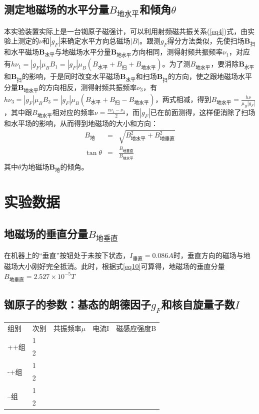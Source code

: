 \documentclass[a4paper]{article}
\begin{document}
\subsection{测定地磁场的水平分量$B_{\text{地水平}}$和倾角$\theta$}
本实验装置实际上是一台铷原子磁强计，可以利用射频磁共振关系(\ref{eq4})式，由实验上测定的$\nu$和$|g_F|$来确定水平方向总磁场$|B|$。跟测$g_F$得分方法类似，先使扫场$\bm{B}_{\text{扫}}$和水平磁场$\bm{B}_{\text{水平}}$与地磁场水平分量$\bm{B}_{\text{地水平}}$方向相同，测得射频共振频率$\nu_1$，对应有$h\nu_1 = |g_F|\mu_BB_1 = |g_F|\mu_B(B_{\text{水平}} + B_{\text{扫}} + B_{\text{地水平}})$。为了测$B_{\text{地水平}}$，要消除$\bm{B}_{\text{水平}}$和$\bm{B}_{\text{扫}}$的影响，于是同时改变水平磁场$\bm{B}_{\text{水平}}$和扫场$\bm{B}_{\text{扫}}$的方向，使之跟地磁场水平分量$\bm{B}_{\text{地水平}}$的方向相反，测得射频共振频率$\nu_3$，有$h\nu_3 = |g_F|\mu_BB_3 = |g_F|\mu_B(B_{\text{水平}} + B_{\text{扫}} - B_{\text{地水平}})$，两式相减，得到$B_{\text{地水平}} = \frac{h\nu}{\mu_B|g_F|}$，其中跟$B_{\text{地水平}}$相对应的频率$\nu = \frac{v\nu_1 - \nu_3}{2}$，而$|g_F|$已在前面测得，这样便消除了扫场和水平场的影响，从而得到地磁场的大小和方向：
\begin{eqnarray}
B_{\text{地}} &=& \sqrt{B^2_{\text{地水平}} + B^2_{\text{地垂直}}}\label{eq7}\\
\tan\theta &=& \frac{B_{\text{地垂直}}}{B_{\text{地水平}}}\label{eq8}
\end{eqnarray}
其中$\theta$为地磁场$\bm{B}_{\text{地}}$的倾角。

\section{实验数据}
\subsection{地磁场的垂直分量$B_{\text{地垂直}}$}
在机器上的“垂直”按钮处于未按下状态，$I_{\text{垂直}} = 0.086A$时，垂直方向的磁场与地磁场大小刚好完全抵消。此时，根据式\ref{eq10}可算得，地磁场的垂直分量$B_{\text{地垂直}} = 2.527\times 10^{-5} T$
\subsection{铷原子的参数：基态的朗德因子$g_F$和核自旋量子数$I$}
\begin{table}[]
    \begin{tabular}{lllll}
    组别                   & 次别 & 共振频率$\mu$ & 电流I & 磁感应强度B \\
    \multirow{2}{*}{++组} & 1  &         &     &        \\
                         & 2  &         &     &        \\
    \multirow{2}{*}{-+组} & 1  &         &     &        \\
                         & 2  &         &     &        \\
    \multirow{2}{*}{--组} & 1  &         &     &        \\
                         & 2  &         &     &       
    \end{tabular}
    \end{table}
\end{document}
